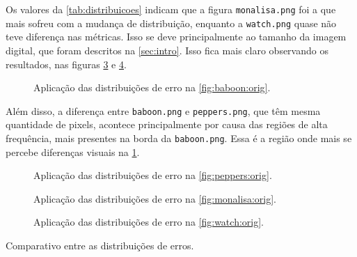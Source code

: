 Os valores da \cref{tab:distribuicoes} indicam que a figura \texttt{monalisa.png} foi a que mais sofreu com a mudança de distribuição, enquanto a \texttt{watch.png} quase não teve diferença nas métricas. Isso se deve principalmente ao tamanho da imagem digital, que foram descritos na \cref{sec:intro}. Isso fica mais claro observando os resultados, nas figuras \ref{fig:dist:monalisa} e \ref{fig:dist:watch}.

\begin{figure}[H]
    \centering
    
    \caption{Aplicação das distribuições de erro na \cref{fig:baboon:orig}.}
    \label{fig:dist:baboon}
\end{figure}

Além disso, a diferença entre \texttt{baboon.png} e \texttt{peppers.png}, que têm mesma quantidade de pixels, acontece principalmente por causa das regiões de alta frequência, mais presentes na borda da \texttt{baboon.png}. Essa é a região onde mais se percebe diferenças visuais na \cref{fig:dist:baboon}.

\begin{figure}[H]
    \centering
    
    \caption{Aplicação das distribuições de erro na \cref{fig:peppers:orig}.}
    \label{fig:dist:peppers}
\end{figure}

\begin{figure}[H]
    \centering
    
    \caption{Aplicação das distribuições de erro na \cref{fig:monalisa:orig}.}
    \label{fig:dist:monalisa}
\end{figure}

\begin{figure}[H]
    \centering
    
    \caption{Aplicação das distribuições de erro na \cref{fig:watch:orig}.}
    \label{fig:dist:watch}
\end{figure}

\begin{table}[H]
    \centering
    \caption{Comparativo entre as distribuições de erros.}
    \label{tab:distribuicoes}
    
\end{table}
